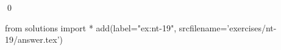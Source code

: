 
\begin{ex} 
  \label{ex:nt-19}
  
  \qed
\end{ex} 
\begin{python0}
from solutions import *
add(label="ex:nt-19",
    srcfilename='exercises/nt-19/answer.tex') 
\end{python0}
